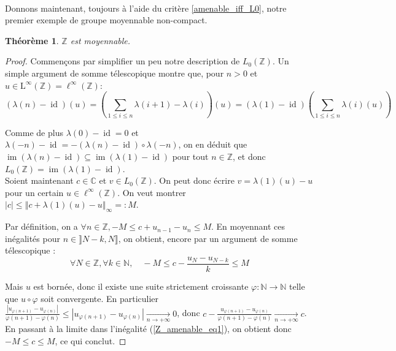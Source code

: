 \documentclass[a4paper,12pt]{article}
\newtheorem{theorem}{Théorème}[section]
\newcommand{\N}{\mathbb{N}}
\newcommand{\Z}{\mathbb{Z}}
\newcommand{\C}{\mathbb{C}}
\newcommand{\norm}[1]{\left\Vert #1\right\Vert}
\newcommand{\abs}[1]{\left\vert#1\right\vert}
\newcommand{\comp}{\circ}
\DeclareMathOperator{\id}{id}
\DeclareMathOperator{\Ima}{im}
\begin{document}
\paragraph{}

Donnons maintenant, toujours à l'aide du critère \ref{amenable_iff_L0}, notre premier exemple de groupe moyennable non-compact.

\begin{theorem}\label{Z_amenable}
    $\Z$ est moyennable.
\end{theorem}

\begin{proof}
    Commençons par simplifier un peu notre description de $L_0(\Z)$. Un simple argument de somme
    télescopique montre que, pour $n>0$ et $u\in \mathrm{L}^\infty(\Z)=\ell^\infty(\Z)$:
    \begin{equation*}
        (\lambda(n)-\id)(u) = \left(\sum_{1\le i\le n} \lambda(i+1) - \lambda(i)\right)(u) = (\lambda(1)-\id)\left(\sum_{1\le i\le n} \lambda(i)(u)\right)
    \end{equation*}

    Comme de plus $\lambda(0)-\id = 0$ et $\lambda(-n)-\id = -(\lambda(n)-\id)\comp\lambda(-n)$,
    on en déduit que $\Ima(\lambda(n)-\id)\subseteq\Ima(\lambda(1)-\id)$ pour tout $n\in\Z$, et donc $L_0(\Z) = \Ima(\lambda(1)-\id)$. \\

    Soient maintenant $c\in\C$ et $v\in L_0(\Z)$. On peut donc écrire $v = \lambda(1)(u)-u$ pour un certain $u\in\ell^\infty(\Z)$. 
    On veut montrer $\abs{c}\le\norm{c + \lambda(1)(u) - u}_\infty =: M$. 

    Par définition, on a $\forall n\in\Z, -M\le c+u_{n-1}-u_n\le M$. En moyennant ces inégalités pour 
    $n\in\rrbracket N-k, N\rrbracket$, on obtient, encore par un argument de somme télescopique :
    \begin{equation}\label{Z_amenable_eq1}
        \forall N\in\Z, \forall k\in\N,\quad -M\le c-\frac{u_N - u_{N-k}}{k} \le M
    \end{equation}

    Mais $u$ est bornée, donc il existe une suite strictement croissante $\varphi:\N\to\N$ telle que $u\comp\varphi$
    soit convergente. En particulier $\frac{\abs{u_{\varphi(n+1)}-u_{\varphi(n)}}}{\varphi(n+1)-\varphi(n)}\le\abs{u_{\varphi(n+1)}-u_{\varphi(n)}}\xrightarrow[n\to+\infty]{}0$, 
    donc $c-\frac{u_{\varphi(n+1)}-u_{\varphi(n)}}{\varphi(n+1)-\varphi(n)}\xrightarrow[n\to+\infty]{}c$. En passant à la limite dans l'inégalité (\ref{Z_amenable_eq1}),
    on obtient donc $-M\le c\le M$, ce qui conclut.
\end{proof}
\end{document}
